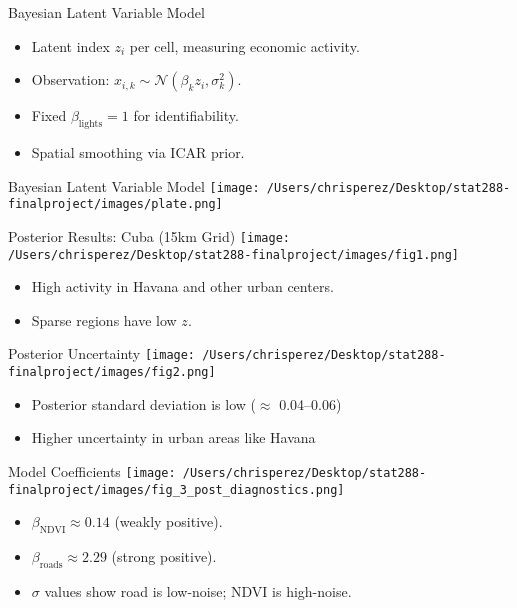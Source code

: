 \documentclass{beamer}
\begin{document}
\begin{frame}{Bayesian Latent Variable Model}
  \begin{itemize}
    \item Latent index $z_i$ per cell, measuring economic activity.
    \item Observation: $x_{i,k} \sim \mathcal{N}(\beta_k z_i, \sigma_k^2)$.
    \item Fixed $\beta_{\text{lights}} = 1$ for identifiability.
    \item Spatial smoothing via ICAR prior.
  \end{itemize}
  \end{frame}
  
\begin{frame}{Bayesian Latent Variable Model}
\centering
\texttt{[image: /Users/chrisperez/Desktop/stat288-finalproject/images/plate.png]}
\end{frame}

\begin{frame}{Posterior Results: Cuba (15km Grid)}
  \centering
  \texttt{[image: /Users/chrisperez/Desktop/stat288-finalproject/images/fig1.png]}
  \begin{itemize}
    \item High activity in Havana and other urban centers.
    \item Sparse regions have low $z$.
  \end{itemize}
\end{frame}

\begin{frame}{Posterior Uncertainty}
\centering
\texttt{[image: /Users/chrisperez/Desktop/stat288-finalproject/images/fig2.png]}
\begin{itemize}
  \item Posterior standard deviation is low ($\approx$ 0.04--0.06)
  \item Higher uncertainty in urban areas like Havana
\end{itemize}

\end{frame}

\begin{frame}{Model Coefficients}
\centering
\texttt{[image: /Users/chrisperez/Desktop/stat288-finalproject/images/fig\_3\_post\_diagnostics.png]}
\begin{itemize}
  \item $\beta_{\text{NDVI}} \approx 0.14$ (weakly positive).
  \item $\beta_{\text{roads}} \approx 2.29$ (strong positive).
  \item $\sigma$ values show road is low-noise; NDVI is high-noise.
\end{itemize}
\end{frame}
\end{document}
